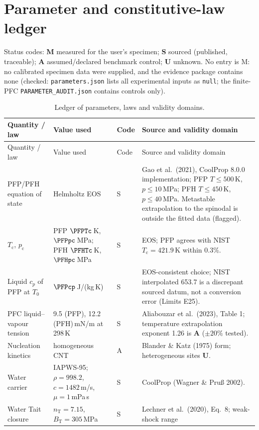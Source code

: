 \section{Parameter and constitutive-law ledger}\label{sec:ledger}
Status codes: \textbf{M} measured for the user's specimen; \textbf{S} sourced (published, traceable);
\textbf{A} assumed/declared benchmark control; \textbf{U} unknown. No entry is M: no calibrated specimen
data were supplied, and the evidence package contains none (checked: \texttt{parameters.json} lists all
experimental inputs as \texttt{null}; the finite-PFC \texttt{PARAMETER\_AUDIT.json} contains controls only).
\begin{center}\small
\begin{longtable}{p{}p{}p{}p{}}
\caption{Ledger of parameters, laws and validity domains.}\label{tab:ledger}\\
\toprule Quantity / law & Value used & Code & Source and validity domain\\\midrule\endfirsthead
\toprule Quantity / law & Value used & Code & Source and validity domain\\\midrule\endhead
PFP/PFH equation of state & Helmholtz EOS & S & Gao et al.\ (2021), CoolProp 8.0.0 implementation; PFP $T\le500$\,K,
$p\le10$\,MPa; PFH $T\le450$\,K, $p\le40$\,MPa. Metastable extrapolation to the spinodal is outside the fitted
data (flagged).\\
$T_{\mathrm c}$, $p_{\mathrm c}$ & PFP $\PFPTc$\,K, $\PFPpc$\,MPa; PFH $\PFHTc$\,K, $\PFHpc$\,MPa & S & EOS; PFP agrees
with NIST $T_{\mathrm c}=421.9$\,K within 0.3\%.\\
Liquid $c_p$ of PFP at $T_0$ & $\PFPcp$\,J/(kg\,K) & S & EOS-consistent choice; NIST interpolated 653.7 is a discrepant
sourced datum, not a conversion error (Limits E25).\\
PFC liquid--vapour tension & 9.5 (PFP), 12.2 (PFH)\,mN/m at 298\,K & S & Aliabouzar et al.\ (2023), Table 1;
temperature extrapolation exponent 1.26 is \textbf{A} ($\pm20\%$ tested).\\
Nucleation kinetics & homogeneous CNT & A & Blander \& Katz (1975) form; heterogeneous sites \textbf{U}.\\
Water carrier & IAPWS-95; $\rho=998.2$, $c=1482$\,m/s, $\mu=1$\,mPa\,s & S & CoolProp (Wagner \& Pru\ss{} 2002).\\
Water Tait closure & $n_{\mathrm T}=7.15$, $B_{\mathrm T}=305$\,MPa & S & Lechner et al.\ (2020), Eq.~8; weak-shock range

\end{longtable}
\end{center}
